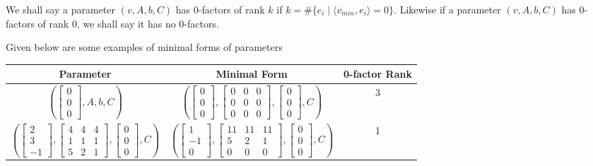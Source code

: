 \documentclass[11pt,letterpaper]{amsart}
\begin{document}
\begin{defin}\label{def:0factor}
    We shall say a parameter $(v, A, b, C)$ has 0-factors of rank $k$ if $k=\#\{e_i\mid \langle v_{min}, e_i\rangle =0\}$. Likewise if a parameter $(v, A, b, C)$ has 0-factors of rank 0, we shall say it has no 0-factors.
\end{defin}
\begin{example} Given below are some examples of minimal forms of parameters
\begin{center}
    \begin{tabular}{|c|c|c|}
        \hline
        Parameter & Minimal Form & 0-factor Rank \\
        \hline
        $\left(\begin{bmatrix} 0 \\ 0 \\ 0\end{bmatrix}, A, b, C \right)$ & $\left(\begin{bmatrix} 0 \\ 0 \\ 0\end{bmatrix}, \begin{bmatrix} 0 & 0 & 0 \\ 0 & 0 & 0 \\ 0 & 0 & 0\end{bmatrix}, \begin{bmatrix} 0 \\ 0 \\ 0\end{bmatrix}, C\right)$ & 3\\
        \hline 
        $\left(\begin{bmatrix} 2 \\ 3 \\ -1\end{bmatrix}, \begin{bmatrix} 4 & 4 & 4 \\ 1 & 1 & 1 \\ 5 & 2 & 1\end{bmatrix}, \begin{bmatrix} 0 \\ 0 \\ 0\end{bmatrix}, C\right)$ & $\left(\begin{bmatrix} 1 \\ -1 \\ 0\end{bmatrix}, \begin{bmatrix} 11 & 11 & 11 \\ 5 & 2 & 1 \\ 0 & 0 & 0\end{bmatrix}, \begin{bmatrix} 0 \\ 0 \\ 0\end{bmatrix}, C\right)$ & 1\\

\end{tabular}
\end{center}
\end{example}
\end{document}
